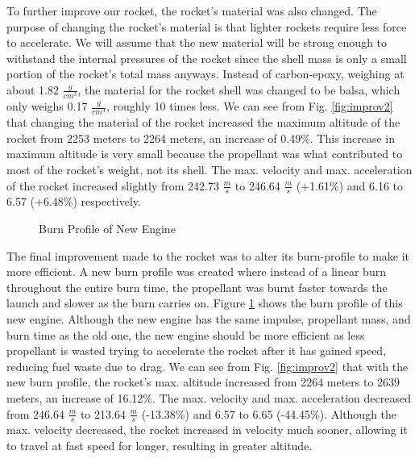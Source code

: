 \documentclass{report}
\begin{document}
\noindent To further improve our rocket, the rocket's material was also changed.
The purpose of changing the rocket's material is that lighter rockets require less force to accelerate.
We will assume that the new material will be strong enough to withstand the internal pressures of the rocket since the shell mass is only a small portion of the rocket's total mass anyways.
Instead of carbon-epoxy, weighing at about 1.82 $\frac{g}{cm^3}$, the material for the rocket shell was changed to be balsa, which only weighs 0.17 $\frac{g}{cm^3}$, roughly 10 times less.
We can see from Fig. \ref{fig:improv2} that changing the material of the rocket increased the maximum altitude of the rocket from 2253 meters to 2264 meters, an increase of 0.49\%.
This increase in maximum altitude is very small because the propellant was what contributed to most of the rocket's weight, not its shell.
The max. velocity and max. acceleration of the rocket increased slightly from 242.73 $\frac{m}{s}$ to 246.64 $\frac{m}{s}$ (+1.61\%) and 6.16 to 6.57 (+6.48\%) respectively.
\\

\begin{figure}[h!]
    \centering
    \caption{Burn Profile of New Engine}
    \label{fig:burnprof}
\end{figure}

\noindent The final improvement made to the rocket was to alter its burn-profile to make it more efficient.
A new burn profile was created where instead of a linear burn throughout the entire burn time, the propellant was burnt faster towards the launch and slower as the burn carries on.
Figure \ref{fig:burnprof} shows the burn profile of this new engine.
Although the new engine has the same impulse, propellant mass, and burn time as the old one, the new engine should be more efficient as less propellant is wasted trying to accelerate the rocket after it has gained speed, reducing fuel waste due to drag.
We can see from Fig. \ref{fig:improv2} that with the new burn profile, the rocket's max. altitude increased from 2264 meters to 2639 meters, an increase of 16.12\%.
The max. velocity and max. acceleration decreased from 246.64 $\frac{m}{s}$ to 213.64 $\frac{m}{s}$ (-13.38\%) and 6.57 to 6.65 (-44.45\%).
Although the max. velocity decreased, the rocket increased in velocity much sooner, allowing it to travel at fast speed for longer, resulting in greater altitude. 
\end{document}
